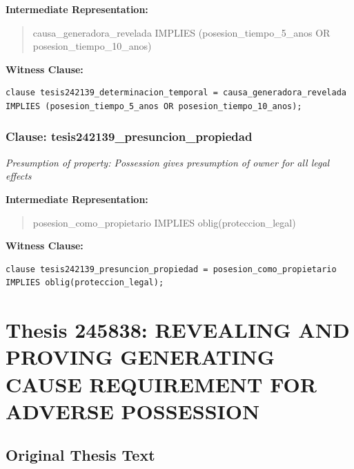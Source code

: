 \documentclass[11pt,a4paper]{article}
\begin{document}
\textbf{Intermediate Representation:}

\begin{quote}
causa\_generadora\_revelada IMPLIES (posesion\_tiempo\_5\_anos OR posesion\_tiempo\_10\_anos)
\end{quote}

\textbf{Witness Clause:}

\begin{lstlisting}[style=witnessstyle, language=Witness]
clause tesis242139_determinacion_temporal = causa_generadora_revelada IMPLIES (posesion_tiempo_5_anos OR posesion_tiempo_10_anos);
\end{lstlisting}

\subsubsection{Clause: tesis242139\_presuncion\_propiedad}

\textit{Presumption of property: Possession gives presumption of owner for all legal effects}

\textbf{Intermediate Representation:}

\begin{quote}
posesion\_como\_propietario IMPLIES oblig(proteccion\_legal)
\end{quote}

\textbf{Witness Clause:}

\begin{lstlisting}[style=witnessstyle, language=Witness]
clause tesis242139_presuncion_propiedad = posesion_como_propietario IMPLIES oblig(proteccion_legal);
\end{lstlisting}

\newpage

\section{Thesis 245838: REVEALING AND PROVING GENERATING CAUSE REQUIREMENT FOR ADVERSE POSSESSION}
\label{thesis:245838}

\subsection{Original Thesis Text}
\end{document}
